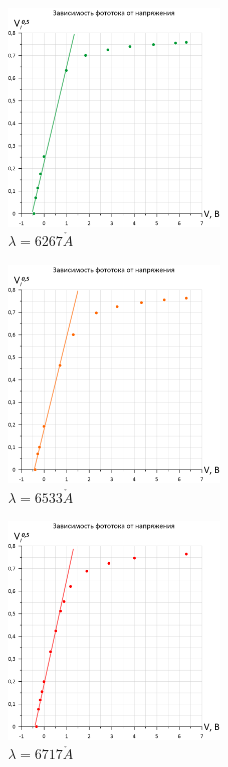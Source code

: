 \documentclass[a4paper, 12pt]{article}
\begin{document}
\begin{figure}[h]
\begin{center}
\includegraphics[width = 0.5\textwidth]{6267.png}
\caption{$\lambda = 6267 \mathring{A}$}
\label{fig:green}
\end{center}
\end{figure}

\begin{figure}[h]
\begin{center}
\includegraphics[width = 0.5\textwidth]{6533.png}
\caption{$\lambda = 6533 \mathring{A}$}
\label{fig:oran}
\end{center}
\end{figure}

\begin{figure}[h]
\begin{center}
\includegraphics[width = 0.5\textwidth]{6717.png}
\caption{$\lambda = 6717 \mathring{A}$}
\label{fig:red}
\end{center}
\end{figure}
\end{document}
